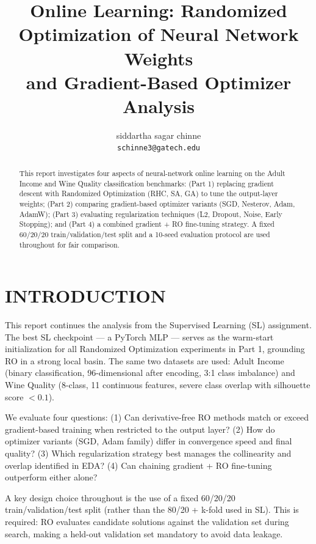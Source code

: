 \documentclass[letterpaper, 10 pt, conference]{ieeeconf}
\title{\LARGE \bf
Online Learning: Randomized Optimization of Neural Network Weights\\
and Gradient-Based Optimizer Analysis
}
\author{siddartha sagar chinne \\
{\tt\small schinne3@gatech.edu}
}
\begin{document}
\maketitle
\thispagestyle{empty}
\pagestyle{empty}

\begin{abstract}
This report investigates four aspects of neural-network online learning on the Adult Income and Wine Quality classification benchmarks: (Part 1) replacing gradient descent with Randomized Optimization (RHC, SA, GA) to tune the output-layer weights; (Part 2) comparing gradient-based optimizer variants (SGD, Nesterov, Adam, AdamW); (Part 3) evaluating regularization techniques (L2, Dropout, Noise, Early Stopping); and (Part 4) a combined gradient + RO fine-tuning strategy. A fixed 60/20/20 train/validation/test split and a 10-seed evaluation protocol are used throughout for fair comparison.
\end{abstract}

\section{INTRODUCTION}

This report continues the analysis from the Supervised Learning (SL) assignment. The best SL checkpoint --- a PyTorch MLP --- serves as the warm-start initialization for all Randomized Optimization experiments in Part 1, grounding RO in a strong local basin. The same two datasets are used: Adult Income (binary classification, 96-dimensional after encoding, 3:1 class imbalance) and Wine Quality (8-class, 11 continuous features, severe class overlap with silhouette score $< 0.1$).

We evaluate four questions: (1) Can derivative-free RO methods match or exceed gradient-based training when restricted to the output layer? (2) How do optimizer variants (SGD, Adam family) differ in convergence speed and final quality? (3) Which regularization strategy best manages the collinearity and overlap identified in EDA? (4) Can chaining gradient + RO fine-tuning outperform either alone?

A key design choice throughout is the use of a fixed 60/20/20 train/validation/test split (rather than the 80/20 + k-fold used in SL). This is required: RO evaluates candidate solutions against the validation set during search, making a held-out validation set mandatory to avoid data leakage.
\end{document}
